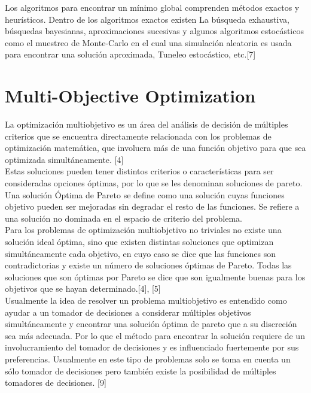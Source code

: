 Los algoritmos para encontrar un mínimo global comprenden métodos exactos y heurísticos. Dentro de los algoritmos exactos existen La búsqueda exhaustiva, búsquedas bayesianas, aproximaciones sucesivas y algunos algoritmos estocásticos como el muestreo de Monte-Carlo en el cual una simulación aleatoria es usada para encontrar una solución aproximada, Tuneleo estocástico, etc.[7] \\

\section{Multi-Objective Optimization}

La optimización multiobjetivo es un área del análisis de decisión de múltiples criterios que se encuentra directamente relacionada con los problemas de optimización matemática, que involucra más de una función objetivo para que sea optimizada simultáneamente. [4] \\

Estas soluciones pueden tener distintos criterios o características para ser consideradas opciones óptimas, por lo que se les denominan soluciones de pareto. Una solución Óptima de Pareto se define como una solución cuyas funciones objetivo pueden ser mejoradas sin degradar el resto de las funciones. Se refiere a una solución no dominada en el espacio de criterio del problema. \\

Para los problemas de optimización multiobjetivo no triviales no existe una solución ideal óptima, sino que existen distintas soluciones que optimizan simultáneamente cada objetivo, en cuyo caso se dice que las funciones son contradictorias y existe un número de soluciones óptimas de Pareto. Todas las soluciones que son óptimas por Pareto se dice que son igualmente buenas para los objetivos que se hayan determinado.[4], [5] \\

Usualmente la idea de resolver un problema multiobjetivo es entendido como ayudar a un tomador de decisiones a considerar múltiples objetivos simultáneamente y encontrar una solución óptima de pareto que a su discreción sea más adecuada. Por lo que el método para encontrar la solución requiere de un involucramiento del tomador de decisiones y es influenciado fuertemente por sus preferencias. Usualmente en este tipo de problemas solo se toma en cuenta un sólo tomador de decisiones pero también existe la posibilidad de múltiples tomadores de decisiones. [9]


